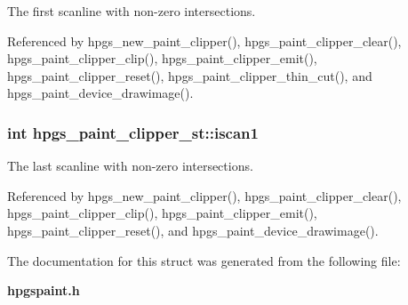The first scanline with non-zero intersections. 

Referenced by hpgs\_\-new\_\-paint\_\-clipper(), hpgs\_\-paint\_\-clipper\_\-clear(), hpgs\_\-paint\_\-clipper\_\-clip(), hpgs\_\-paint\_\-clipper\_\-emit(), hpgs\_\-paint\_\-clipper\_\-reset(), hpgs\_\-paint\_\-clipper\_\-thin\_\-cut(), and hpgs\_\-paint\_\-device\_\-drawimage().
\subsubsection[iscan1]{\setlength{\rightskip}{0pt plus 5cm}int {\bf hpgs\_\-paint\_\-clipper\_\-st::iscan1}}\label{structhpgs__paint__clipper__st_c2711333e8f5dfc95b6a33f0c4954b6f}


The last scanline with non-zero intersections. 

Referenced by hpgs\_\-new\_\-paint\_\-clipper(), hpgs\_\-paint\_\-clipper\_\-clear(), hpgs\_\-paint\_\-clipper\_\-clip(), hpgs\_\-paint\_\-clipper\_\-emit(), hpgs\_\-paint\_\-clipper\_\-reset(), and hpgs\_\-paint\_\-device\_\-drawimage().

The documentation for this struct was generated from the following file:\begin{CompactItemize}
\item 
{\bf hpgspaint.h}\end{CompactItemize}
